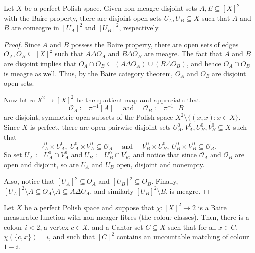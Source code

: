 \begin{lemma}\label{lemma:graph_localization}
    Let $X$ be a perfect Polish space.
    Given non-meagre disjoint sets $A,B\subseteq[X]^2$ with the Baire property, there are disjoint open sets $U_A,U_B\subseteq X$ such that $A$ and $B$ are comeagre in $[U_A]^2$ and $[U_B]^2$, respectively.
\end{lemma}

\begin{proof}
    Since $A$ and $B$ possess the Baire property, there are open sets of edges $O_A,O_B\subseteq[X]^2$ such that $A\Delta O_A$ and $B\Delta O_B$ are meagre.
    The fact that $A$ and $B$ are disjoint implies that $O_A\cap O_B\subseteq(A\Delta O_A)\cup(B\Delta O_B)$, and hence $O_A\cap O_B$ is meagre as well.
    Thus, by the Baire category theorem, $O_A$ and $O_B$ are disjoint open sets.

    Now let $\pi\colon X^2\to[X]^2$ be the quotient map and appreciate that $$\mathcal O_A:=\pi^{-1}[A]\quad\text{ and }\quad\mathcal O_B:=\pi^{-1}[B]$$ are disjoint, symmetric open subsets of the Polish space $X^2\setminus\{(x,x):x\in X\}$.
    Since $X$ is perfect, there are open pairwise disjoint sets $U_A^0,V_A^0,U_B^0,V_B^0\subseteq X$ such that $$V_A^0\times U_A^0,\; U_A^0\times V_A^0\subseteq\mathcal O_A\quad\text{ and }\quad V_B^0\times U_B^0,\; U_B^0\times V_B^0\subseteq\mathcal O_B.$$ So set $U_A:=U_A^0\cap V_A^0$ and $U_B:=U_B^0\cap V_B^0$, and notice that since $\mathcal O_A$ and $\mathcal O_B$ are open and disjoint, so are $U_A$ and $U_B$ open, disjoint and nonempty.

    Also, notice that $[U_A]^2\subseteq O_A$ and $[U_B]^2\subseteq O_B$.
    Finally, $[U_A]^2\setminus A\subseteq O_A\setminus A\subseteq A\Delta O_A$, and similarly $[U_B]^2\setminus B$, is meagre.
\end{proof}

\begin{theorem}\label{thm:inf_const_bal}
    Let $X$ be a perfect Polish space and suppose that $\chi\colon[X]^2\to2$ is a Baire measurable function with non-meager fibres (the colour classes).
    Then, there is a colour $i<2$, a vertex $c\in X$, and a Cantor set $C\subseteq X$ such that for all $x\in C$, $\chi(\{c,x\})=i$, and such that $[C]^2$ contains an uncountable matching of colour $1-i$.
\end{theorem}

